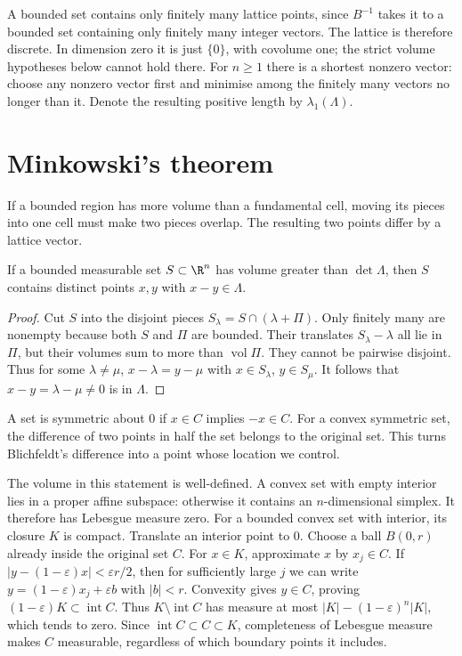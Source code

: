 A bounded set contains only finitely many lattice points, since $B^{-1}$
takes it to a bounded set containing only finitely many integer vectors.
The lattice is therefore discrete. In dimension zero it is just $\{0\}$,
with covolume one; the strict volume hypotheses below cannot hold there.
For $n\ge1$ there is a shortest nonzero vector: choose any nonzero vector first and minimise among the finitely many
vectors no longer than it. Denote the resulting positive length by
$\lambda_1(\Lambda)$.

\section{Minkowski's theorem}

If a bounded region has more volume than a fundamental cell, moving its
pieces into one cell must make two pieces overlap. The resulting two
points differ by a lattice vector.

\begin{lemma}[Blichfeldt]\label{geometry:lem:blichfeldt}
If a bounded measurable set $S\subset\R^n$ has volume greater than
$\det\Lambda$, then $S$ contains distinct points $x,y$ with
$x-y\in\Lambda$.
\end{lemma}
\begin{proof}
Cut $S$ into the disjoint pieces $S_\lambda=S\cap(\lambda+\Pi)$.
Only finitely many are nonempty because both $S$ and $\Pi$ are bounded.
Their translates $S_\lambda-\lambda$ all lie in $\Pi$, but their
volumes sum to more than $\operatorname{vol}\Pi$.
They cannot be pairwise disjoint. Thus for some $\lambda\ne\mu$,
$x-\lambda=y-\mu$ with $x\in S_\lambda$, $y\in S_\mu$.
It follows that $x-y=\lambda-\mu\ne0$ is in $\Lambda$.
\end{proof}

A set is symmetric about $0$ if $x\in C$ implies $-x\in C$.
For a convex symmetric set, the difference of two points in half the set
belongs to the original set. This turns Blichfeldt's difference into a
point whose location we control.

The volume in this statement is well-defined. A convex set with empty
interior lies in a proper affine subspace: otherwise it contains an
$n$-dimensional simplex. It therefore has Lebesgue measure zero.
For a bounded convex set with interior, its closure $K$ is compact.
Translate an interior point to $0$. Choose a ball $B(0,r)$ already inside the original set $C$.
For $x\in K$, approximate $x$ by $x_j\in C$. If
$|y-(1-\varepsilon)x|<\varepsilon r/2$, then for sufficiently large $j$
we can write $y=(1-\varepsilon)x_j+\varepsilon b$ with $|b|<r$.
Convexity gives $y\in C$, proving
$(1-\varepsilon)K\subset\operatorname{int}C$.
Thus $K\setminus\operatorname{int}C$ has measure at most
$|K|-(1-\varepsilon)^n|K|$, which tends to zero.
Since $\operatorname{int}C\subset C\subset K$, completeness of
Lebesgue measure makes $C$ measurable, regardless of which boundary
points it includes.

